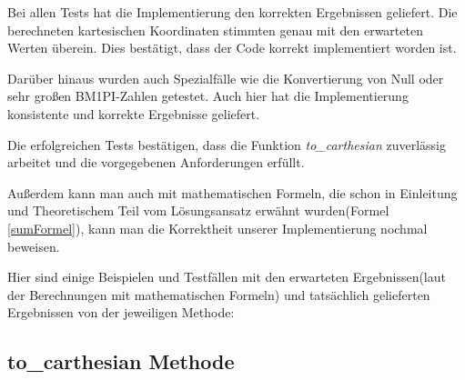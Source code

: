 \documentclass[course=erap]{aspdoc}
\begin{document}
    Bei allen Tests hat die Implementierung den korrekten Ergebnissen geliefert. Die berechneten kartesischen Koordinaten stimmten genau mit den erwarteten Werten überein. Dies bestätigt, dass der Code korrekt implementiert worden ist.

    Darüber hinaus wurden auch Spezialfälle wie die Konvertierung von Null oder sehr großen BM1PI-Zahlen getestet. Auch hier hat die Implementierung konsistente und korrekte Ergebnisse geliefert.

    Die erfolgreichen Tests bestätigen, dass die Funktion \textit{to\_carthesian} zuverlässig arbeitet und die vorgegebenen Anforderungen erfüllt.

    Außerdem kann man auch mit mathematischen Formeln, die schon in Einleitung und Theoretischem Teil vom Lösungsansatz erwähnt wurden(Formel \ref{sumFormel}), kann man die Korrektheit unserer Implementierung nochmal beweisen.

    Hier sind einige Beispielen und Testfällen mit den erwarteten Ergebnissen(laut der Berechnungen mit mathematischen Formeln) und tatsächlich gelieferten Ergebnissen von der jeweiligen Methode:

    \subsection{to\_carthesian Methode}

\end{document}
